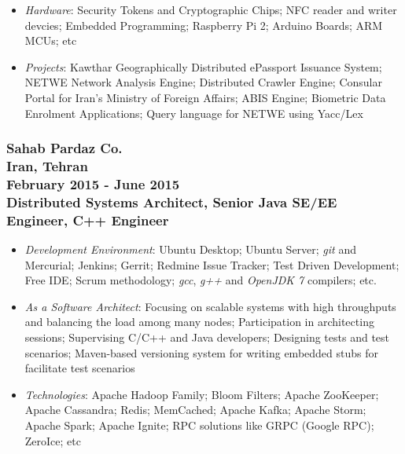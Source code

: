 \documentclass[10pt,a4paper]{article}
\begin{document}
\begin{itemize}
    \item \small \textit {Hardware}: Security Tokens and Cryptographic Chips; NFC reader and writer devcies; Embedded Programming; Raspberry Pi 2; Arduino Boards; ARM MCUs; etc
    \item \small \textit {Projects}: Kawthar Geographically Distributed ePassport Issuance System; NETWE Network Analysis Engine; Distributed Crawler Engine; Consular Portal for Iran's Ministry of Foreign Affairs; ABIS Engine; Biometric Data Enrolment Applications; Query language for NETWE using Yacc/Lex
  \end{itemize}
  \setlength{\leftskip}{0pt}
  \setlength{\rightskip}{0cm}
	  
\subsubsection{{\large Sahab Pardaz Co.} \\ 
\textnormal{Iran, Tehran} \\ 
\textnormal{February 2015 - June 2015} \\ 
{Distributed Systems Architect, Senior Java SE/EE Engineer, C++ Engineer}}
	\setlength{\leftskip}{0.5cm}
  \setlength{\rightskip}{1cm}
  \begin{itemize}
    \setlength{\rightskip}{1cm}
    \setlength\itemsep{0em}
    \item \small \textit {Development Environment}: Ubuntu Desktop; Ubuntu Server; \textit{git} and Mercurial; Jenkins; Gerrit; Redmine Issue Tracker; Test Driven Development; Free IDE; Scrum methodology; \textit{gcc}, \textit{g++} and \textit{OpenJDK 7} compilers; etc.
    \item \small \textit {As a Software Architect}: Focusing on scalable systems with high throughputs and balancing the load among many nodes; Participation in architecting sessions; Supervising C/C++ and Java developers; Designing tests and test scenarios; Maven-based versioning system for writing embedded stubs for facilitate test scenarios
    \item \small \textit {Technologies}: Apache Hadoop Family; Bloom Filters; Apache ZooKeeper; Apache Cassandra; Redis; MemCached; Apache Kafka; Apache Storm; Apache Spark; Apache Ignite; RPC solutions like GRPC (Google RPC); ZeroIce; etc
  \end{itemize}
  \setlength{\leftskip}{0pt}
  \setlength{\rightskip}{0cm}
	  
\end{document}
